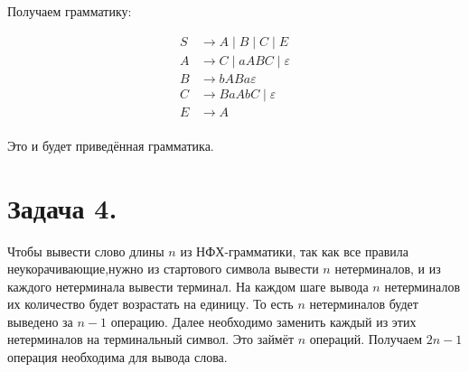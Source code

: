 \documentclass[12pt]{article}
\theoremstyle{definition}
\theoremstyle{definition}
\let\eps\varepsilon
\begin{document}
Получаем грамматику:
\vspace{-3ex}
\begin{multicols}{2}
	\begin{align*}
		S &\to A \mid B \mid C \mid E \\
		A &\to C  \mid aABC \mid \eps\\
		B &\to bABa \eps\\
		C &\to BaAbC \mid \eps\\
		E &\to A\\		
	\end{align*}
\end{multicols}
\vspace{-2ex}

Это и будет приведённая грамматика.

\section*{Задача 4.}
Чтобы вывести слово длины $n$ из НФХ-грамматики, так как все правила неукорачивающие,нужно из стартового символа вывести $n$ нетерминалов, и из каждого нетерминала вывести терминал. На каждом шаге вывода $n$ нетерминалов их количество будет возрастать на единицу. То есть $n$ нетерминалов будет выведено за $n-1$ операцию. Далее необходимо заменить каждый из этих нетерминалов на терминальный символ. Это займёт $n$ операций. Получаем $2n-1$ операция необходима для вывода слова.
\end{document}

